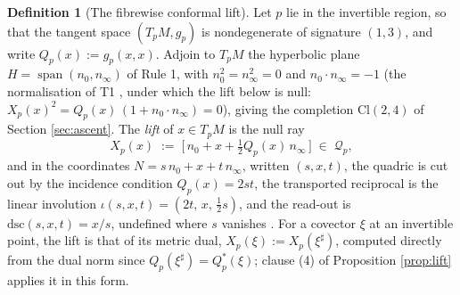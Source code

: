 \documentclass[11pt]{article}
\theoremstyle{definition}
\newtheorem{definition}[theorem]{Definition}
\newcommand{\Cl}{\mathrm{Cl}}
\newcommand{\nO}{n_0}
\newcommand{\nInf}{n_\infty}
\newcommand{\dsc}{\mathrm{dsc}}
\begin{document}
\begin{definition}[The fibrewise conformal lift]\label{def:lift}
Let $p$ lie in the invertible region, so that the tangent space $(T_pM, g_p)$ is nondegenerate of signature $(1,3)$, and write $Q_p(x) := g_p(x,x)$.
Adjoin to $T_pM$ the hyperbolic plane $H = \operatorname{span}(\nO, \nInf)$ of Rule 1, with $\nO^2 = \nInf^2 = 0$ and $\nO \cdot \nInf = -1$ (the normalisation of T1 \cite{ButlerT1}, under which the lift below is null: $X_p(x)^{2} = Q_p(x)\,(1 + \nO\cdot\nInf) = 0$), giving the completion $\Cl(2,4)$ of Section \ref{sec:ascent}. The \emph{lift} of $x \in T_pM$ is the null ray
\begin{equation}\label{eq:t5lift}
X_p(x) \;:=\; \bigl[\, \nO + x + \tfrac12 Q_p(x)\, \nInf \,\bigr] \;\in\; \mathcal{Q}_p ,
\end{equation}
and in the coordinates $N = s\,\nO + x + t\,\nInf$, written $(s,x,t)$, the quadric is cut out by the incidence condition $Q_p(x) = 2st$, the transported reciprocal is the linear involution $\iota(s,x,t) = (2t,\, x,\, \tfrac12 s)$, and the read-out is $\dsc(s,x,t) = x/s$, undefined where $s$ vanishes \cite[Thm.~4.10, Prop.~4.21, Lem.~4.23]{ButlerT1}. For a covector $\xi$ at an invertible point, the lift is that of its metric dual, $X_p(\xi) := X_p(\xi^{\sharp})$, computed directly from the dual norm since $Q_p(\xi^{\sharp}) = Q^{*}_p(\xi)$; clause (4) of Proposition \ref{prop:lift} applies it in this form.
\end{definition}
\end{document}
